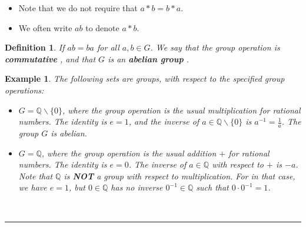 \documentclass[a4paper,12pt]{report}
\newcounter{statement}
\numberwithin{statement}{chapter}
\newtheorem{defn}[statement]{Definition}
\newtheorem{eg}[statement]{\bf Example}
\numberwithin{equation}{chapter}
\numberwithin{section}{chapter}
\numberwithin{subsection}{section}
\begin{document}
\begin{itemize}
\item 
Note that we do not require that $a* b = b * a$.
  
\item 
We often write $ab$ to denote $a* b$.
  \end{itemize}

\begin{defn}
If $ab = ba$ for all $a, b \in G$. We say that the group operation is
 {\bf commutative} , and that $G$ is an  {\bf abelian group} .
\end{defn}

\begin{eg}
The following sets are groups, with respect to the specified group operations:
\begin{itemize}
\item 
$G = \mathbb{Q} \backslash \{0\}$, where the group operation is the usual multiplication for rational numbers.
The identity is $e = 1$, and the inverse of $a \in \mathbb{Q}\backslash\{0\}$ is $a^{-1} = \frac{1}{a}$.
The group $G$ is abelian.
  
\item 
$G = \mathbb{Q}$, where the group operation is the usual addition $+$ for rational numbers. The identity is $e = 0$.
The inverse of $a \in \mathbb{Q}$ with respect to $+$ is $-a$.
Note that $\mathbb{Q}$ is  {\bf NOT}  a group with respect to multiplication. For in that case, we have $e = 1$, but $0 \in \mathbb{Q}$ has no inverse
$0^{-1} \in \mathbb{Q}$ such that $0\cdot 0^{-1} = 1$.
  \end{itemize}





\quad\\\hrule
\quad\\

\end{eg}
\end{document}
